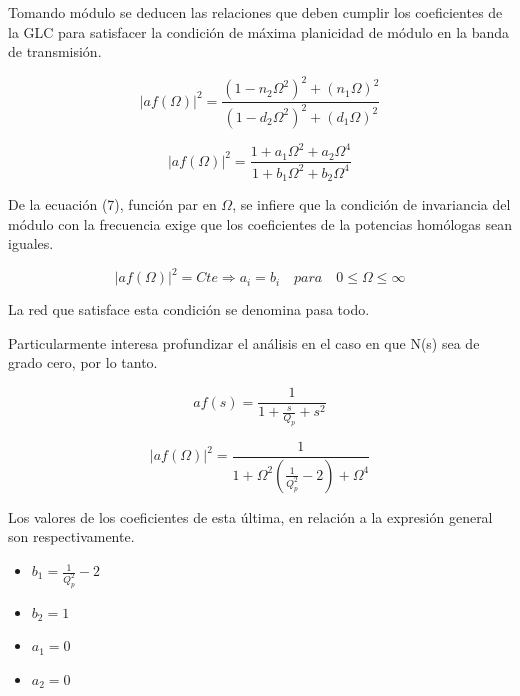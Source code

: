 \documentclass[12pt,A4paper,titlepage]{article}
\begin{document}
\bigskip
\hspace{1mm} Tomando módulo se deducen las relaciones que deben cumplir los coeficientes de la GLC para satisfacer la condición de máxima planicidad de módulo en la banda de transmisión.

\begin{equation}
    |af(\Omega)|^2 = \frac{(1 - n_2 \Omega ^2)^2 + (n_1 \Omega)^2}{(1 - d_2 \Omega ^2)^2 + (d_1 \Omega)^2}
\end{equation}

\begin{equation}
    |af(\Omega)|^2 = \frac{1 + a_1 \Omega ^2 + a_2 \Omega^4}{1 + b_1 \Omega ^2 + b_2 \Omega^4}
\end{equation}

\bigskip
\hspace{1mm} De la ecuación (7), función par en \( \Omega \), se infiere que la condición de invariancia del módulo con la frecuencia exige que los coeficientes de la potencias homólogas sean iguales.

\begin{equation}
    |af(\Omega)|^2 = Cte \Longrightarrow a_i = b_i \quad para \quad 0 \leq \Omega \leq \infty
\end{equation}

\bigskip
\hspace{1mm} La red que satisface esta condición se denomina pasa todo.

\bigskip
\hspace{1mm} Particularmente interesa profundizar el análisis en el caso en que N(s) sea de grado cero, por lo tanto.

\begin{equation}
    af(s) = \frac{1}{1 + \frac{s}{Q_p} + s^2}
\end{equation}

\begin{equation}
    |af(\Omega )|^2 = \frac{1}{1 + \Omega ^2 \left(\frac{1}{Q_p^2} - 2\right) + \Omega ^4}
\end{equation}

\bigskip
\hspace{1mm} Los valores de los coeficientes de esta última, en relación a la expresión general son respectivamente.

\begin{itemize}[itemsep=1pt]
    \item \( b_1 = \frac{1}{Q_p^2} - 2 \)
    \item \( b_2 = 1 \)
    \item \( a_1 = 0 \)
    \item \( a_2 = 0 \)
\end{itemize}
\end{document}
